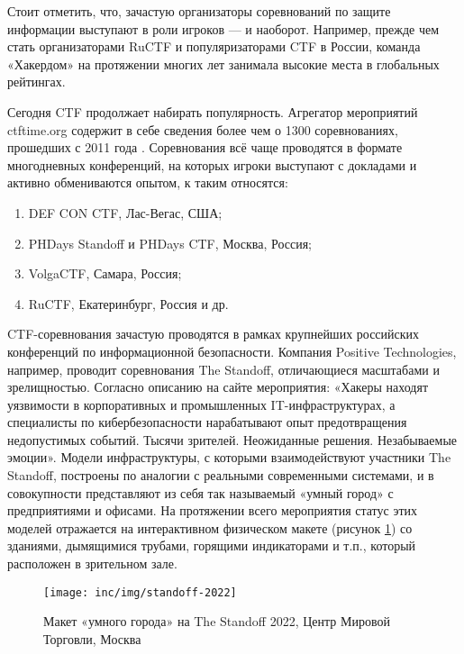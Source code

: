 Стоит отметить, что, зачастую организаторы соревнований по защите информации выступают в роли игроков --- и наоборот. Например, прежде чем стать организаторами RuCTF и популяризаторами CTF в России, команда «Хакердом» на протяжении многих лет занимала высокие места в глобальных рейтингах\cite{HackerdomRating}.

Сегодня CTF продолжает набирать популярность. Агрегатор мероприятий ctftime.org содержит в себе сведения более чем о 1300 соревнованиях, прошедших с 2011 года \cite{CTFTimeTotal}. Соревнования всё чаще проводятся в формате многодневных конференций, на которых игроки выступают с докладами и активно обмениваются опытом, к таким относятся:
\begin{enumerate}
  \item DEF CON CTF, Лас-Вегас, США;
  \item PHDays Standoff и PHDays CTF, Москва, Россия;
  \item VolgaCTF, Самара, Россия;
  \item RuCTF, Екатеринбург, Россия и др.
\end{enumerate}

CTF-соревнования зачастую проводятся в рамках крупнейших российских конференций по информационной безопасности. Компания Positive Technologies, например, проводит соревнования The Standoff, отличающиеся масштабами и зрелищностью. Согласно описанию на сайте мероприятия: «Хакеры находят уязвимости в корпоративных и промышленных IT-инфраструктурах, а специалисты по кибербезопасности нарабатывают опыт предотвращения недопустимых событий. Тысячи зрителей. Неожиданные решения. Незабываемые эмоции»\cite{TheStandoff}. Модели инфраструктуры, с которыми взаимодействуют участники The Standoff, построены по аналогии с реальными современными системами, и в совокупности представляют из себя так называемый «умный город» с предприятиями и офисами. На протяжении всего мероприятия статус этих моделей отражается на интерактивном физическом макете (рисунок \ref{fig:standoff-2022}) со зданиями, дымящимися трубами, горящими индикаторами и т.п., который расположен в зрительном зале.

\begin{figure}
  \centering
  \texttt{[image: inc/img/standoff-2022]}
  \caption{Макет «умного города» на The Standoff 2022, Центр Мировой Торговли, Москва}
  \label{fig:standoff-2022}
\end{figure}

